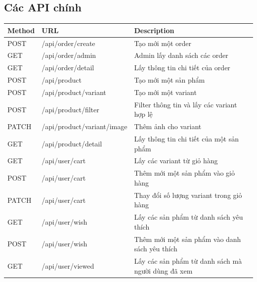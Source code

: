 \subsection{Các API chính}
\begin{table}[H]
\centering
\begin{tabular}{|p{1.5cm}|p{6.5cm}|p{7cm}|}
\hline
Method & URL & Description \\
\hline
POST & /api/order/create & Tạo mới một order  \\
\hline
GET & /api/order/admin & Admin lấy danh sách các order  \\
\hline
GET & /api/order/detail & Lấy thông tin chi tiết của order  \\
\hline
POST & /api/product & Tạo mới một sản phẩm  \\
\hline
POST & /api/product/variant & Tạo mới một variant \\
\hline
POST & /api/product/filter & Filter thông tin và lấy các variant hợp lệ \\
\hline
PATCH & /api/product/variant/image & Thêm ảnh cho variant\\
\hline
GET & /api/product/detail & Lấy thông tin chi tiết của một sản phẩm\\
\hline
GET & /api/user/cart & Lấy các variant từ giỏ hàng\\
\hline
POST & /api/user/cart & Thêm mới một sản phẩm vào giỏ hàng\\
\hline
PATCH & /api/user/cart & Thay đổi số lượng variant trong giỏ hàng\\
\hline
GET & /api/user/wish & Lấy các sản phẩm từ danh sách yêu thích\\
\hline
POST & /api/user/wish & Thêm mới một sản phẩm vào danh sách yêu thích\\
\hline

GET & /api/user/viewed & Lấy các sản phẩm từ danh sách mà người dùng đã xem\\
\hline



\end{tabular}
\end{table}
\newpage


